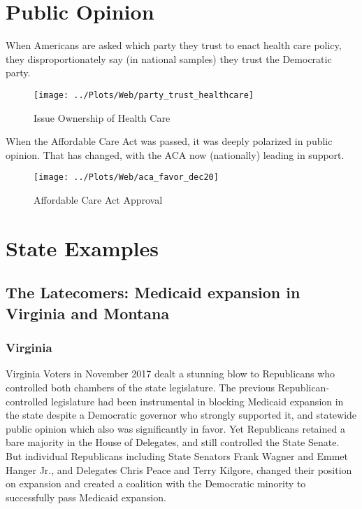 \documentclass[
  oneside]{book}
\begin{document}
\hypertarget{public-opinion}{%
\section{Public Opinion}\label{public-opinion}}

When Americans are asked which party they trust to enact health care policy, they disproportionately say (in national samples) they trust the Democratic party.

\begin{figure}
\texttt{[image: ../Plots/Web/party\_trust\_healthcare]} \caption{Issue Ownership of Health Care}\label{fig:pew-health-ownership}
\end{figure}

When the Affordable Care Act was passed, it was deeply polarized in public opinion. That has changed, with the ACA now (nationally) leading in support.

\begin{figure}
\texttt{[image: ../Plots/Web/aca\_favor\_dec20]} \caption{Affordable Care Act Approval}\label{fig:kff-aca}
\end{figure}

\hypertarget{state-examples}{%
\section{State Examples}\label{state-examples}}

\hypertarget{the-latecomers-medicaid-expansion-in-virginia-and-montana}{%
\subsection{The Latecomers: Medicaid expansion in Virginia and Montana}\label{the-latecomers-medicaid-expansion-in-virginia-and-montana}}

\hypertarget{virginia}{%
\subsubsection{Virginia}\label{virginia}}

Virginia Voters in November 2017 dealt a stunning blow to Republicans who controlled both chambers of the state legislature. The previous Republican-controlled legislature had been instrumental in blocking Medicaid expansion in the state despite a Democratic governor who strongly supported it, and statewide public opinion which also was significantly in favor. Yet Republicans retained a bare majority in the House of Delegates, and still controlled the State Senate. But individual Republicans including State Senators Frank Wagner and Emmet Hanger Jr., and Delegates Chris Peace and Terry Kilgore, changed their position on expansion and created a coalition with the Democratic minority to successfully pass Medicaid expansion.
\end{document}
